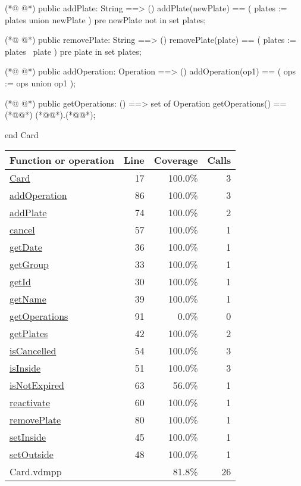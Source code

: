 \begin{vdmpp}[breaklines=true]
 
(*@
\label{addPlate:74}
@*)
public addPlate: String ==> ()
 addPlate(newPlate) == (
  plates := plates union {newPlate}
 )
 pre newPlate not in set plates;

(*@
\label{removePlate:80}
@*)
public removePlate: String ==> ()
 removePlate(plate) == (
  plates := plates \ {plate}
 )
 pre plate in set plates;
 
(*@
\label{addOperation:86}
@*)
public addOperation: Operation ==> ()
 addOperation(op1) == (
  ops := ops union {op1}
 );
 
(*@
\label{getOperations:91}
@*)
public getOperations: () ==> set of Operation
 getOperations() == (*@@*) (*@@*).(*@@*);
 
end Card
\end{vdmpp}
\bigskip
\begin{longtable}{|l|r|r|r|}
\hline
Function or operation & Line & Coverage & Calls \\
\hline
\hline
\hyperref[Card:17]{Card} & 17&100.0\% & 3 \\
\hline
\hyperref[addOperation:86]{addOperation} & 86&100.0\% & 3 \\
\hline
\hyperref[addPlate:74]{addPlate} & 74&100.0\% & 2 \\
\hline
\hyperref[cancel:57]{cancel} & 57&100.0\% & 1 \\
\hline
\hyperref[getDate:36]{getDate} & 36&100.0\% & 1 \\
\hline
\hyperref[getGroup:33]{getGroup} & 33&100.0\% & 1 \\
\hline
\hyperref[getId:30]{getId} & 30&100.0\% & 1 \\
\hline
\hyperref[getName:39]{getName} & 39&100.0\% & 1 \\
\hline
\hyperref[getOperations:91]{getOperations} & 91&0.0\% & 0 \\
\hline
\hyperref[getPlates:42]{getPlates} & 42&100.0\% & 2 \\
\hline
\hyperref[isCancelled:54]{isCancelled} & 54&100.0\% & 3 \\
\hline
\hyperref[isInside:51]{isInside} & 51&100.0\% & 3 \\
\hline
\hyperref[isNotExpired:63]{isNotExpired} & 63&56.0\% & 1 \\
\hline
\hyperref[reactivate:60]{reactivate} & 60&100.0\% & 1 \\
\hline
\hyperref[removePlate:80]{removePlate} & 80&100.0\% & 1 \\
\hline
\hyperref[setInside:45]{setInside} & 45&100.0\% & 1 \\
\hline
\hyperref[setOutside:48]{setOutside} & 48&100.0\% & 1 \\
\hline
\hline
Card.vdmpp & & 81.8\% & 26 \\
\hline
\end{longtable}

